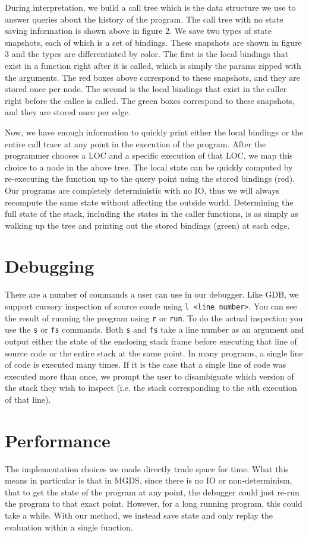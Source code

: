 \documentclass[letterpaper, 10pt]{article}
\newcommand{\ttt}{\texttt}
\begin{document}
During interpretation, we build a call tree which is the data
structure we use to answer queries about the history of the program.
The call tree with no state saving information is shown above in
figure 2.  We save two types of state snapshots, each of which is a
set of bindings.  These snapshots are shown in figure 3 and the types
are differentiated by color.  The first is the local bindings that
exist in a function right after it is called, which is simply the
params zipped with the arguments.  The red boxes above correspond to
these snapshots, and they are stored once per node.  The second is the
local bindings that exist in the caller right before the callee is
called.  The green boxes correspond to these snapshots, and they are
stored once per edge.

Now, we have enough information to quickly print either the local
bindings or the entire call trace at any point in the execution of the
program.  After the programmer chooses a LOC and a specific execution
of that LOC, we map this choice to a node in the above tree.  The
local state can be quickly computed by re-executing the function up to
the query point using the stored bindings (red).  Our programs are
completely deterministic with no IO, thus we will always recompute the
same state without affecting the outside world.  Determining the full
state of the stack, including the states in the caller functions, is
as simply as walking up the tree and printing out the stored bindings
(green) at each edge.

\section{Debugging}
There are a number of commands a user can use in our debugger. Like GDB,
we support cursory inspection of source coude using
\ttt{l <line number>}. You can see the result of running the program using
\ttt{r} or \ttt{run}. To do the actual inspection you use the \ttt{s} or
\ttt{fs} commands. Both \ttt{s} and \ttt{fs} take a line number as an
argument and output either the state of the enclosing stack frame before
executing that line of source code or the entire stack at the same
point. In many programs, a single line of code is executed many times. If
it is the case that a single line of code was executed more than once, we
prompt the user to disambiguate which version of the stack they wish to
inspect (i.e. the stack corresponding to the $n$th execution of that
line).

\section{Performance}
The implementation choices we made directly trade space for time. What
this means in particular is that in MGDS, since there is no IO or
non-determinism, that to get the state of the program at any point, the
debugger could just re-run the program to that exact point. However, for a
long running program, this could take a while. With our method, we instead
save state and only replay the evaluation within a single function.
\end{document}
